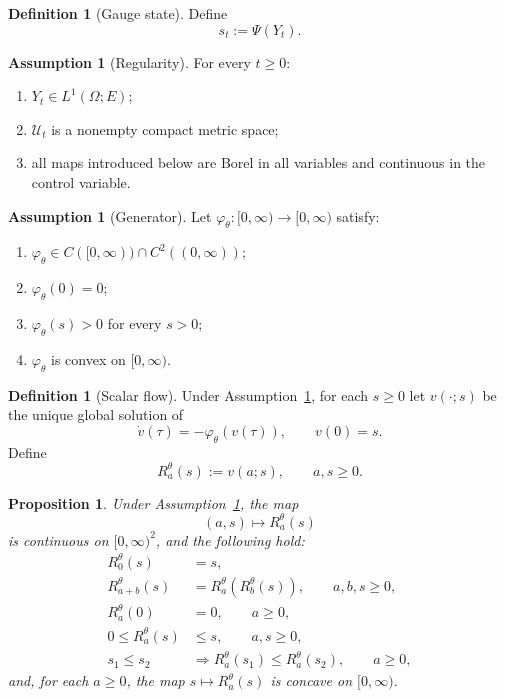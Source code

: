 \documentclass{article}
\newtheorem{proposition}[theorem]{Proposition}
\theoremstyle{definition}
\newtheorem{definition}[theorem]{Definition}
\newtheorem{assumption}[theorem]{Assumption}
\begin{document}
\begin{definition}[Gauge state]
Define
\begin{equation*}
s_t:=\Psi(Y_t).
\end{equation*}
\end{definition}

\begin{assumption}[Regularity]
\label{ass:regularity}
For every $t\ge 0$:
\begin{enumerate}
\item $Y_t\in L^1(\Omega;E)$;
\item $\mathcal U_t$ is a nonempty compact metric space;
\item all maps introduced below are Borel in all variables and continuous in the control variable.
\end{enumerate}
\end{assumption}

\begin{assumption}[Generator]
\label{ass:generator}
Let $\varphi_\theta:[0,\infty)\to[0,\infty)$ satisfy:
\begin{enumerate}
\item $\varphi_\theta\in C([0,\infty))\cap C^2((0,\infty))$;
\item $\varphi_\theta(0)=0$;
\item $\varphi_\theta(s)>0$ for every $s>0$;
\item $\varphi_\theta$ is convex on $[0,\infty)$.
\end{enumerate}
\end{assumption}

\begin{definition}[Scalar flow]
Under Assumption~\ref{ass:generator}, for each $s\ge 0$ let $v(\cdot;s)$ be the unique global solution of
\begin{equation}
\dot v(\tau)=-\varphi_\theta(v(\tau)),
\qquad
v(0)=s.
\label{eq:scalar_ode}
\end{equation}
Define
\begin{equation*}
R_a^\theta(s):=v(a;s),
\qquad
a,s\ge 0.
\end{equation*}
\end{definition}

\begin{proposition}
\label{prop:flow}
Under Assumption~\ref{ass:generator}, the map
\[
(a,s)\mapsto R_a^\theta(s)
\]
is continuous on $[0,\infty)^2$, and the following hold:
\begin{align}
R_0^\theta(s)&=s,
\label{eq:R0}
\\
R_{a+b}^\theta(s)&=R_a^\theta(R_b^\theta(s)),
\qquad a,b,s\ge 0,
\label{eq:Rsemigroup}
\\
R_a^\theta(0)&=0,
\qquad a\ge 0,
\label{eq:Rzero}
\\
0\le R_a^\theta(s)&\le s,
\qquad a,s\ge 0,
\label{eq:Rcontract}
\\
s_1\le s_2 &\Longrightarrow R_a^\theta(s_1)\le R_a^\theta(s_2),
\qquad a\ge 0,
\label{eq:Rmono}
\end{align}
and, for each $a\ge 0$, the map $s\mapsto R_a^\theta(s)$ is concave on $[0,\infty)$.
\end{proposition}
\end{document}
